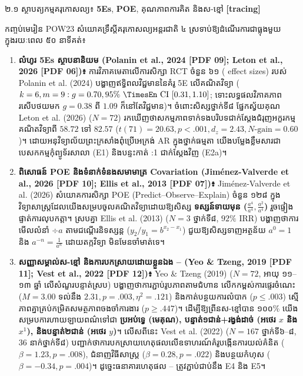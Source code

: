 \documentclass[a4paper,12pt]{article}
\newcommand{\en}[1]{{\TimesEn #1}}
\newcommand{\enbf}[1]{{\TimesEn\bfseries #1}}
\newcommand{\cnum}[1]{{\fontsize{11pt}{13pt}\selectfont\ding{\numexpr181+#1\relax}}\hspace{0.15em}}
\newcommand{\subsec}[1]{%
  \Needspace{1.7cm}%
  \par\vspace{6pt}%
  {\linespread{1.0}\muol\fontsize{11.5pt}{18.5pt}\selectfont #1}%
  \par\vspace{2pt}%
}
\begin{document}
\subsec{២.១ ស្ថាបត្យកម្មគរុកោសល្យ៖ \enbf{5Es}, \enbf{POE}, គុណភាពការគិត និងស-ខ្មៅ \enbf{[tracing]}}
កញ្ចប់មេរៀន \en{POW23} សំយោគទ្រឹស្ដីគរុកោសល្យអន្តរជាតិ ៤ ស្រទាប់ឱ្យដំណើរការជាធ្លុងមួយក្នុងរយៈពេល ៥០ នាទីគត់៖
\begin{enumerate}[leftmargin=1.6em, itemsep=3pt, topsep=2pt]
  \item \textbf{លំហូរ \en{5Es} ស្ថាបនានិយម (\en{Polanin et al., 2024 [PDF 09]; Leton et al., 2026 [PDF 06]})៖} ការវិភាគមេតាលើការសិក្សា \en{RCT} ចំនួន ៦១ (\en{156 effect sizes}) របស់ \en{Polanin et al. (2024)} បង្ហាញឥទ្ធិពលវិជ្ជមាននៃគំរូ \en{5E} លើគណិតវិទ្យា ($k=6, m=9: g=0.70, 95\%\ \text{\en{CI}}\ [0.31, 1.10]$; ទោះលទ្ធផលវិភាគភាពរសើបថយមក $g=0.38$ ពី $1.09$ ក៏នៅតែវិជ្ជមាន)។ ចំពោះសិស្សថ្នាក់ទី៨ ផ្នែកស្វ័យគុណ \en{Leton et al. (2026)} ($N=72$) រកឃើញថាសកម្មភាពទាក់ទងបរិបទជាក់ស្ដែងជំរុញអក្ខរកម្មគណិតវិទ្យាពី $58.72$ ទៅ $82.57$ ($t(71)=20.63, p<.001, d_z=2.43, N\text{-gain}=0.60$)។ ដោយអនុវិទ្យាល័យព្រះក្រសាំងពុំប្រើអេក្រង់ \en{AR} ក្នុងថ្នាក់ធម្មតា យើងបម្លែងខ្លឹមសារជាបេសកកម្មកុំព្យូទ័រសាលា (\en{E1}) និងបន្ទះកាត់ \en{1:1} ជាក់ស្ដែងវិញ (\en{E2a})។
  \item \textbf{ពិសោធន៍ \en{POE} និងទំនាក់ទំនងសមាមាត្រ \en{Covariation} (\en{Jim\'enez-Valverde et al., 2026 [PDF 10]; Ellis et al., 2013 [PDF 07]})៖} \en{Jim\'enez-Valverde et al. (2026)} សំយោគការសិក្សា \en{POE (Predict--Observe--Explain)} ចំនួន ១២៨ ក្នុងវិទ្យាសាស្ត្រដែលយើងសម្របចូលគណិតវិទ្យាដោយឱ្យសិស្ស \textbf{ទស្សន៍ទាយមុន ($\frac{a^4}{a^4}, \frac{a^2}{a^4}$)} រួចផ្ទៀងផ្ទាត់ការលុបកត្តា។ ស្របគ្នា \en{Ellis et al. (2013)} ($N=3$ ថ្នាក់ទី៨, $92\%$ \en{IRR}) បង្ហាញថាការមើលលំនាំ $\div a$ តាមជណ្ដើរនិទស្សន្ត ($y_2/y_1=b^{x_2-x_1}$) ជួយឱ្យសិស្សទាញអត្ថន័យ $a^0=1$ និង $a^{-n}=\frac{1}{a^n}$ ដោយតក្កវិទ្យា មិនមែនចាំមាត់ទេ។
  \item \textbf{សញ្ញាសម្គាល់ស-ខ្មៅ \en{[tracing]} និងការបកស្រាយដោយខ្លួនឯង \cnum{1}--\cnum{5} (\en{Yeo \& Tzeng, 2019 [PDF 11]; Vest et al., 2022 [PDF 12]})៖} \en{Yeo \& Tzeng (2019)} ($N=72$, អាយុ ១១--១៣ ឆ្នាំ លើសំណួរបន្ទាត់ស្រប) បង្ហាញថាការភ្ជាប់រូបភាពតាមជំហាន \en{[tracing]} លើកកម្ពស់ការផ្ទេរចំណេះ ($M=3.00$ ទល់នឹង $2.31, p=.003, \eta^2=.121$) និងកាត់បន្ថយការលំបាក ($p\le .003$) ស្មើភាពគ្នាគ្រប់កម្រិតសមត្ថភាពចងចាំការងារ ($p\ge .447$)។ ដើម្បីឱ្យព្រីនស-ខ្មៅបាន ១០០\% យើងសម្របការហាយឡាយពណ៌ទៅជា \textbf{ប្រអប់ទ្វេ (មេគុណ), បន្ទាត់១ជាន់+រង្វង់ដាច់ (អថេរ $x$ និង $x^1$), និងបន្ទាត់២ជាន់ (អថេរ $y$)}។ លើសពីនេះ \en{Vest et al. (2022)} ($N=167$ ថ្នាក់ទី៦--៨, $36$ នាក់ថ្នាក់ទី៨) បញ្ជាក់ថាការបកស្រាយហេតុផលលើឧទាហរណ៍គំរូបង្កើនការយល់គំនិត ($\beta=1.23, p=.008$), ជំនាញវិធីសាស្ត្រ ($\beta=0.28, p=.022$) និងបន្ថយកំហុស ($\beta=-0.34, p=.004$)។ ដូច្នេះធនាគារហេតុផល \cnum{1}--\cnum{5} ត្រូវភ្ជាប់ជាប់នឹង \en{E4} និង \en{E5}។

\end{enumerate}
\end{document}
